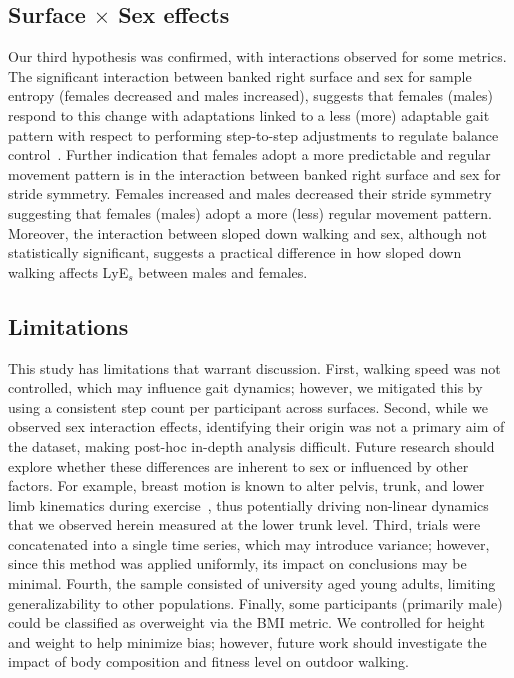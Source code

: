 \documentclass[authoryear,preprint,review,12pt]{elsarticle}
\begin{document}
\subsection{Surface $\times$ Sex effects}
Our third hypothesis was confirmed, with interactions observed for some metrics. The significant interaction between banked right surface and sex for sample entropy (females decreased and males increased), suggests that females (males) respond to this change with adaptations linked to a less (more) adaptable gait pattern with respect to performing step-to-step adjustments to regulate balance control~\citep{tochigi2012entropy, Zhang2013comprehensive}. Further indication that females adopt a more predictable and regular movement pattern is in the interaction between banked right surface and sex for stride symmetry. Females increased and males decreased their stride symmetry suggesting that females (males) adopt a more (less) regular movement pattern.
Moreover, the interaction between sloped down walking and sex, although not statistically significant, suggests a practical difference in how sloped down walking affects LyE${_s}$ between males and females. 


\subsection{Limitations}
This study has limitations that warrant discussion. First, walking speed was not controlled, which may influence gait dynamics; however, we mitigated this by using a consistent step count per participant across surfaces. Second, while we observed sex interaction effects, identifying their origin was not a primary aim of the dataset, making post-hoc in-depth analysis difficult. Future research should explore whether these differences are inherent to sex or influenced by other factors. For example, breast motion is known to alter pelvis, trunk, and lower limb kinematics during exercise~\citep{mcghee2020breast, fong2022greater, milligan2015influence}, thus potentially driving non-linear dynamics that we observed herein measured at the lower trunk level. Third, trials were concatenated into a single time series, which may introduce variance; however, since this method was applied uniformly, its impact on conclusions may be minimal. Fourth, the sample consisted of  university aged young adults, limiting generalizability to other populations. Finally, some participants (primarily male) could be classified as overweight via the BMI metric. We controlled for height and weight to help minimize bias; however, future work should investigate the impact of body composition and fitness level on outdoor walking.
\end{document}
